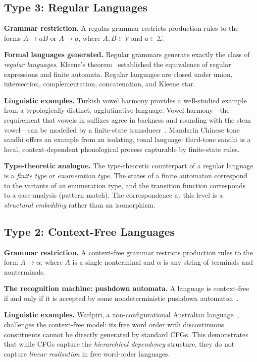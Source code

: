 \documentclass[12pt,a4paper]{article}
\begin{document}
\subsection{Type 3: Regular Languages}

\textbf{Grammar restriction.} A regular grammar restricts production rules to
the forms $A \to aB$ or $A \to a$, where $A, B \in V$ and $a \in \Sigma$.

\textbf{Formal languages generated.} Regular grammars generate exactly the
class of \emph{regular languages}. Kleene's theorem~\cite{Kleene1956}
established the equivalence of regular expressions and finite automata. Regular
languages are closed under union, intersection, complementation, concatenation,
and Kleene star.

\textbf{Linguistic examples.} Turkish vowel harmony provides a well-studied
example from a typologically distinct, agglutinative language. Vowel
harmony---the requirement that vowels in suffixes agree in backness and
rounding with the stem vowel---can be modelled by a finite-state
transducer~\cite{KaplanKay1994}. Mandarin Chinese tone sandhi offers an
example from an isolating, tonal language: third-tone sandhi is a local,
context-dependent phonological process capturable by finite-state rules.

\textbf{Type-theoretic analogue.} The type-theoretic counterpart of a regular
language is a \emph{finite type} or \emph{enumeration type}. The states of a
finite automaton correspond to the variants of an enumeration type, and the
transition function corresponds to a case-analysis (pattern match). The
correspondence at this level is a \emph{structural embedding} rather than an
isomorphism.

\subsection{Type 2: Context-Free Languages}

\textbf{Grammar restriction.} A context-free grammar restricts production
rules to the form $A \to \alpha$, where $A$ is a single nonterminal and
$\alpha$ is any string of terminals and nonterminals.

\textbf{The recognition machine: pushdown automata.} A language is
context-free if and only if it is accepted by some nondeterministic pushdown
automaton~\cite{Chomsky1962,Evey1963}.

\textbf{Linguistic examples.} Warlpiri, a non-configurational Australian
language~\cite{Hale1983}, challenges the context-free model: its free word
order with discontinuous constituents cannot be directly generated by standard
CFGs. This demonstrates that while CFGs capture the \emph{hierarchical
dependency} structure, they do not capture \emph{linear realisation} in free
word-order languages.
\end{document}
